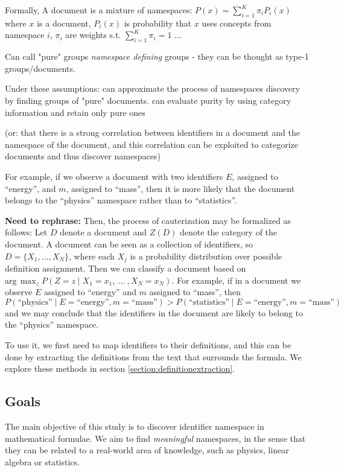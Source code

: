 Formally, A document is a mixture of namespaces: $P(x) = \sum_{i=1}^K \pi_i P_i(x)$ where 
$x$ is a document, $P_i(x)$ is probability that $x$ uses concepts from namespace $i$,
$\pi_i$ are weights s.t. $\sum_{i = 1}^K \pi_i = 1$  ... 



Can call "pure" groups \emph{namespace defining} groups - they can be thought as type-1 
groups/documents.


Under these assumptions: can approximate the process of namespaces discovery by 
finding groups of "pure" documents. can evaluate purity by using category information 
and retain only pure ones

(or: that there is a strong correlation between identifiers in
a document and the namespace of the document, and this correlation can be exploited to
categorize documents and thus discover namespaces)


For example, if we observe a document with
two identifiers $E$, assigned to ``energy'', and $m$, assigned to ``mass'', then it is more
likely that the document belongs to the ``physics'' namespace rather than to ``statistics''.

\textbf{Need to rephrase: }Then, the process of cauterization may be formalized as follows: 
Let $D$ denote a document and $Z(D)$ denote the category of the document. A document can be 
seen as a collection of identifiers, so $D = \{ X_1, ..., X_N \}$, where 
each $X_j$ is a probability distribution over possible definition assignment. 
Then we can classify a document based on 
$\text{arg} \, \max_z P(Z=z \mid X_1=x_1, \ ... \ ,  X_N=x_N)$. For example, if in a document 
we observe $E$ assigned to ``energy'' and $m$ assigned to ``mass'', then 
$P(\text{``physics''} \mid E=\text{``energy''}, m=\text{``mass''}) > P(\text{``statistics''} \mid E=\text{``energy''}, m=\text{``mass''})$ 
and we may conclude that the identifiers in the document are likely to belong to 
the ``physics'' namespace.

To use it, we first need to map identifiers to their definitions, and this can be done by
extracting the definitions from the text that surrounds the formula. We explore these methods 
in section \ref{section:definitionextraction}.




\subsection{Goals}

The main objective of this study is to discover identifier namespace in mathematical formulae.
We aim to find \emph{meaningful} namespaces, in the sense that they can be related to a real-world area of knowledge, such as physics, linear algebra or statistics.

